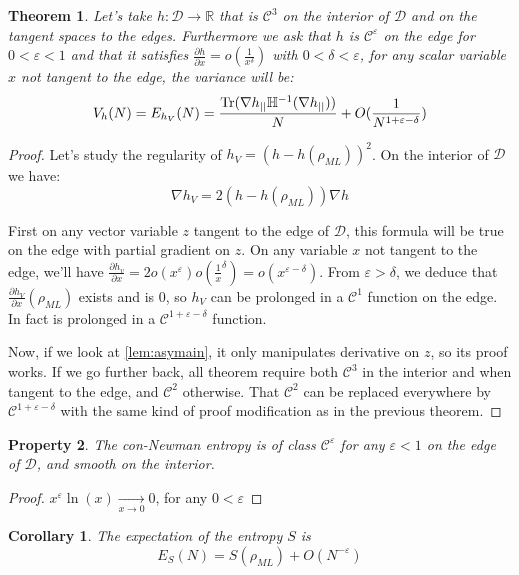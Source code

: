 \documentclass[10pt,a4paper]{report}
\theoremstyle{plain}
\newtheorem{thm}{Theorem}[chapter]
\newtheorem{prop}[thm]{Property}
\newtheorem{cor}{Corollary}[thm]
\theoremstyle{definition}
\theoremstyle{remark}
\newcommand{\R}{\ensuremath{\mathbb{R}}}
\newcommand{\dpar}[2]{\frac{\partial{#1}}{\partial{#2}}}
\DeclareMathOperator{\Tr}{Tr}
\newcommand{\class}[1]{{\mathscr{C}^{#1}}}
\newcommand{\ml}{_{M\!L}}
\begin{document}
\begin{thm}\label{thm:asyvarS}
  Let's take $h : \mathcal{D} \to \R$ that is $\class 3$ on the interior of
  $\mathcal{D}$ and  on the tangent spaces to the edges. Furthermore we ask that
  $h$ is $\class\varepsilon$ on the edge for $0 < \varepsilon < 1$ and that it satisfies
  $\dpar h x = o(\frac1{x^{\delta}})$ with $0 < \delta < \varepsilon$,
  for any scalar variable $x$ not tangent to the edge, the variance will be:
  \[V_h(N) = E_{h_V}(N) = \frac{\Tr(\nabla h\pr \mathbb H\inv(\nabla h\pr))}N
    +O(\frac 1 {N^{1 + \varepsilon - \delta}})\]
\end{thm}

\begin{proof}
  Let's study the regularity of $h_V = {(h - h(\rho\ml))}^2$. On the interior of
  $\mathcal{D}$ we have:
  \[\nabla h_V = 2(h-h(\rho\ml))\nabla h\]

  First on any vector variable $z$ tangent to the edge of $\mathcal{D}$, this formula
  will be true on the edge with partial gradient on $z$. On any variable $x$ not
  tangent to the edge, we'll have $\dpar {h_v} x = 2
  o(x^\varepsilon)o(\frac1x^{\delta}) = o(x^{\varepsilon - \delta})$. From
  $\varepsilon > \delta$, we deduce that
  $\dpar {h_V} x(\rho\ml)$ exists and is $0$, so $h_V$ can be prolonged in a
  $\class 1$ function on the edge. In fact is prolonged in a $\class {1 +
    \varepsilon - \delta}$ function.

  Now, if we look at \cref{lem:asymain}, it only manipulates derivative on $z$,
  so its proof works. If we go further back, all theorem require both $\class 3$
  in the interior and when tangent to the edge, and $\class 2$ otherwise. That
  $\class 2$ can be replaced everywhere by $\class {1 + \varepsilon - \delta}$
  with the same kind of proof modification as in the previous theorem.
\end{proof}

\begin{prop}
The con-Newman entropy is of class $\class \varepsilon$ for any
$\varepsilon < 1$ on the edge of $\mathcal{D}$, and smooth on the interior.
\end{prop}

\begin{proof}
  $x^\varepsilon \ln(x) \xrightarrow[x\to0]{} 0$, for any $0< \varepsilon$
\end{proof}

\begin{cor}
  The expectation of the entropy $S$ is
  \[E_S(N) = S(\rho\ml) + O(N^{-\varepsilon})\]
\end{cor}
\end{document}
